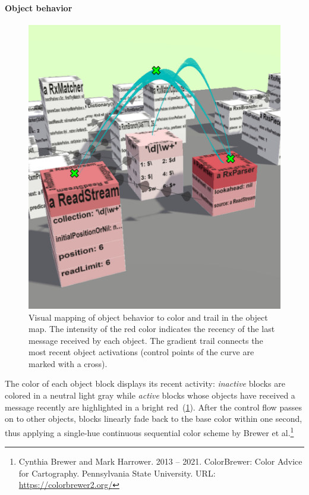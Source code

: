 \paragraph{Object behavior}
\label{sec:visualization_approach/mapping/object_behavior}

\begin{figure}
	\includegraphics[height=.25\textheight]{sections/03_visualization_approach/mapping/object_behavior}
	\caption{
		Visual mapping of object behavior to color and trail in the object map.
		The intensity of the red color indicates the recency of the last message received by each object.
		The gradient trail connects the most recent object activations (control points of the curve are marked with a \protect{} cross).
	}
	\label{fig:visualization_approach/mapping/object_behavior}
\end{figure}

The color of each object block displays its recent activity:
\emph{inactive} blocks are colored in a neutral light gray while \emph{active} blocks whose objects have received a message recently are highlighted in a bright red~(\cref{fig:visualization_approach/mapping/object_behavior}).
After the control flow passes on to other objects, blocks linearly fade back to the base color within one second, thus applying a single-hue continuous sequential color scheme by Brewer et al.\footnote{Cynthia Brewer and Mark Harrower. 2013 -- 2021. ColorBrewer: Color Advice for Cartography. Pennsylvania State University. \textsc{URL}: \url{https://colorbrewer2.org/}}


